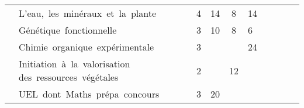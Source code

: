 \begin{tabular}{c|m{6cm}|cm{0.75cm}|cm{0.75cm}|cm{0.75cm}|cm{0.75cm}|}
\cline{2-6} 
 & \color{black} \mbox{L'eau, les minéraux et la plante} & \color{black} 4 & \color{black} 14 & \color{black} 8 & \color{black} 14 & 
\\\cline{2-6}
 & \cellcolor{couleurClaire} \color{couleurTexte} \mbox{Génétique fonctionnelle} & \cellcolor{couleurClaire} \color{couleurTexte} 3 & \cellcolor{couleurClaire} \color{couleurTexte} 10 & \cellcolor{couleurClaire} \color{couleurTexte} 8 &\cellcolor{couleurClaire} \color{couleurTexte} 6 \\ 
\cline{2-6} 
& \color{black} \mbox{Chimie organique expérimentale} & \color{black} 3 & \color{black} & \color{black} & \color{black} 24 & 
\\\cline{2-6}
 & \cellcolor{couleurClaire} \color{couleurTexte} \mbox{Initiation à la valorisation} \mbox{des ressources végétales} & \cellcolor{couleurClaire} \color{couleurTexte} 2 & \cellcolor{couleurClaire} \color{couleurTexte} & \cellcolor{couleurClaire} \color{couleurTexte} 12 &\cellcolor{couleurClaire} \color{couleurTexte} \\
\cline{2-6} 
& \color{black} \mbox{UEL dont Maths prépa concours} & \color{black} 3 & \color{black} 20 & \color{black} & \color{black} & 
\\
\cline{1-6}
\end{tabular}

